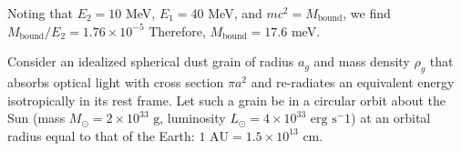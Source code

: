 \documentclass[11pt,largemargins]{homework}
\begin{document}
Noting that $E_2 = 10$ MeV, $E_1 = 40$ MeV, and $mc^2 = M_{\mathrm{bound}}$, we find
$M_{\mathrm{bound}} / E_{2} = 1.76 \times 10^{-5}$ Therefore, $M_{\mathrm{bound}} = 17.6$ meV. 

\setcounter{questionCounter}{5}

\question
Consider an idealized spherical dust grain of radius $a_g$ and mass density $\rho_g$ that absorbs optical light with cross section $\pi a^2$ and re-radiates an equivalent energy isotropically in its rest frame.  Let such a grain be in a circular orbit about the Sun (mass $M_{\odot} = 2 \times 10^{33} \mbox{ g}$, luminosity $L_{\odot} = 4 \times 10^{33} \mbox{ erg} \mbox{ s}^-1$) at an orbital radius equal to that of the Earth: $1 \mbox{ AU} = 1.5 \times 10^{13} \mbox{ cm}.$ 
\end{document}
